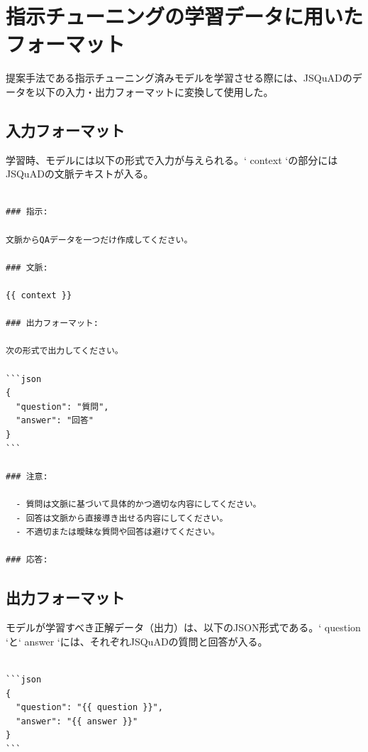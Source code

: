 \documentclass[a4paper,11pt]{jreport}
\begin{document}
\section{指示チューニングの学習データに用いたフォーマット}
提案手法である指示チューニング済みモデルを学習させる際には、JSQuADのデータを以下の入力・出力フォーマットに変換して使用した。

\subsection{入力フォーマット}
学習時、モデルには以下の形式で入力が与えられる。`{{ context }}`の部分にはJSQuADの文脈テキストが入る。

\begin{screen}
\begin{verbatim}

### 指示:

文脈からQAデータを一つだけ作成してください。

### 文脈:

{{ context }}

### 出力フォーマット:

次の形式で出力してください。

```json
{
  "question": "質問",
  "answer": "回答"
}
```

### 注意:

  - 質問は文脈に基づいて具体的かつ適切な内容にしてください。
  - 回答は文脈から直接導き出せる内容にしてください。
  - 不適切または曖昧な質問や回答は避けてください。

### 応答:

\end{verbatim}
\end{screen}

\subsection{出力フォーマット}
モデルが学習すべき正解データ（出力）は、以下のJSON形式である。`{{ question }}`と`{{ answer }}`には、それぞれJSQuADの質問と回答が入る。

\begin{screen}
\begin{verbatim}

```json
{
  "question": "{{ question }}",
  "answer": "{{ answer }}"
}
```

\end{verbatim}
\end{screen}
\end{document}
